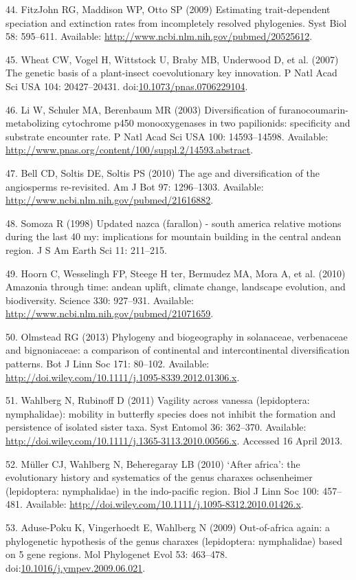 \documentclass[10pt]{article}
\begin{document}
44. FitzJohn RG, Maddison WP, Otto SP (2009) Estimating trait-dependent
speciation and extinction rates from incompletely resolved phylogenies.
Syst Biol 58: 595--611. Available:
\url{http://www.ncbi.nlm.nih.gov/pubmed/20525612}.

45. Wheat CW, Vogel H, Wittstock U, Braby MB, Underwood D, et al. (2007)
The genetic basis of a plant-insect coevolutionary key innovation. P
Natl Acad Sci USA 104: 20427--20431.
doi:\href{http://dx.doi.org/10.1073/pnas.0706229104}{10.1073/pnas.0706229104}.

46. Li W, Schuler MA, Berenbaum MR (2003) Diversification of
furanocoumarin-metabolizing cytochrome p450 monooxygenases in two
papilionids: specificity and substrate encounter rate. P Natl Acad Sci
USA 100: 14593--14598. Available:
\url{http://www.pnas.org/content/100/suppl.2/14593.abstract}.

47. Bell CD, Soltis DE, Soltis PS (2010) The age and diversification of
the angiosperms re-revisited. Am J Bot 97: 1296--1303. Available:
\url{http://www.ncbi.nlm.nih.gov/pubmed/21616882}.

48. Somoza R (1998) Updated nazca (farallon) - south america relative
motions during the last 40 my: implications for mountain building in the
central andean region. J S Am Earth Sci 11: 211--215.

49. Hoorn C, Wesselingh FP, Steege H ter, Bermudez MA, Mora A, et al.
(2010) Amazonia through time: andean uplift, climate change, landscape
evolution, and biodiversity. Science 330: 927--931. Available:
\url{http://www.ncbi.nlm.nih.gov/pubmed/21071659}.

50. Olmstead RG (2013) Phylogeny and biogeography in solanaceae,
verbenaceae and bignoniaceae: a comparison of continental and
intercontinental diversification patterns. Bot J Linn Soc 171: 80--102.
Available: \url{http://doi.wiley.com/10.1111/j.1095-8339.2012.01306.x}.

51. Wahlberg N, Rubinoff D (2011) Vagility across vanessa (lepidoptera:
nymphalidae): mobility in butterfly species does not inhibit the
formation and persistence of isolated sister taxa. Syst Entomol 36:
362--370. Available:
\url{http://doi.wiley.com/10.1111/j.1365-3113.2010.00566.x}. Accessed 16
April 2013.

52. Müller CJ, Wahlberg N, Beheregaray LB (2010) `After africa': the
evolutionary history and systematics of the genus charaxes ochsenheimer
(lepidoptera: nymphalidae) in the indo-pacific region. Biol J Linn Soc
100: 457--481. Available:
\url{http://doi.wiley.com/10.1111/j.1095-8312.2010.01426.x}.

53. Aduse-Poku K, Vingerhoedt E, Wahlberg N (2009) Out-of-africa again:
a phylogenetic hypothesis of the genus charaxes (lepidoptera:
nymphalidae) based on 5 gene regions. Mol Phylogenet Evol 53: 463--478.
doi:\href{http://dx.doi.org/10.1016/j.ympev.2009.06.021}{10.1016/j.ympev.2009.06.021}.
\end{document}
